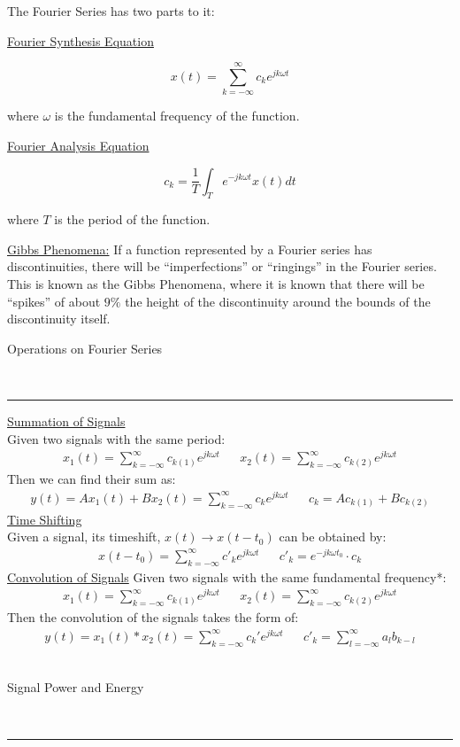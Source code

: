 \documentclass{article}
\newcommand{\header}[1]{\begin{large}\noindent #1\end{large}\\\rule{\textwidth}{0.5pt}}
\newcommand{\gap}{\medskip\\}
\newcommand{\centertext}[1]{\begin{center}#1\end{center}}
\begin{document}
The Fourier Series has two parts to it:
\begin{multicols}{2}
    \centertext{\underline{Fourier Synthesis Equation}}
    \[
        x(t) = \sum_{k = -\infty}^\infty c_k e^{jk\omega t}    
    \]
    \centertext{where $\omega$ is the fundamental frequency of the function.}
    \vfill\null\columnbreak
    \centertext{\underline{Fourier Analysis Equation}}
    \[
        c_k = \frac{1}{T}\int_T e^{-jk\omega t}x(t){d}t    
    \]
    \centertext{where $T$ is the period of the function.}
    \vfill\null
\end{multicols}

\underline{Gibbs Phenomena:} If a function represented by a Fourier series has discontinuities,
there will be ``imperfections'' or ``ringings'' in the Fourier series. This is known
as the Gibbs Phenomena, where it is known that there will be ``spikes'' of about $9\%$
the height of the discontinuity around the bounds of the discontinuity itself.
\gap
\header{Operations on Fourier Series}

\underline{Summation of Signals}
\smallskip\\
Given two signals with the same period:
\begin{align*}
    x_1(t) = \sum_{k = -\infty}^\infty c_{k(1)}e^{jk\omega t} && x_2(t) = \sum_{k = -\infty}^\infty c_{k(2)}e^{jk\omega t}
\end{align*}
Then we can find their sum as:
\begin{align*}
    y(t) = Ax_1(t) + Bx_2(t) = \sum_{k = -\infty}^\infty c_k e^{jk\omega t} && c_k = Ac_{k(1)} + Bc_{k(2)}
\end{align*}
\underline{Time Shifting}
\smallskip\\
Given a signal, its timeshift, $x(t) \to x(t - t_0)$ can be obtained by:
\begin{align*}
    x(t - t_0) = \sum_{k = -\infty}^\infty c'_k e^{jk\omega t} && c'_k = e^{-jk\omega t_0}\cdot c_k
\end{align*}
\underline{Convolution of Signals}
Given two signals with the same fundamental frequency*:
\begin{align*}
    x_1(t) = \sum_{k = -\infty}^\infty c_{k(1)}e^{jk\omega t} && x_2(t) = \sum_{k = -\infty}^\infty c_{k(2)}e^{jk\omega t}
\end{align*}
Then the convolution of the signals takes the form of:
\begin{align*}
    y(t) = x_1(t) \ast x_2(t) = \sum_{k = -\infty}^\infty c_k' e^{jk\omega t} && c'_k = \sum_{l = -\infty}^\infty a_l b_{k - l}
\end{align*}
\gap
\header{Signal Power and Energy}
\end{document}
